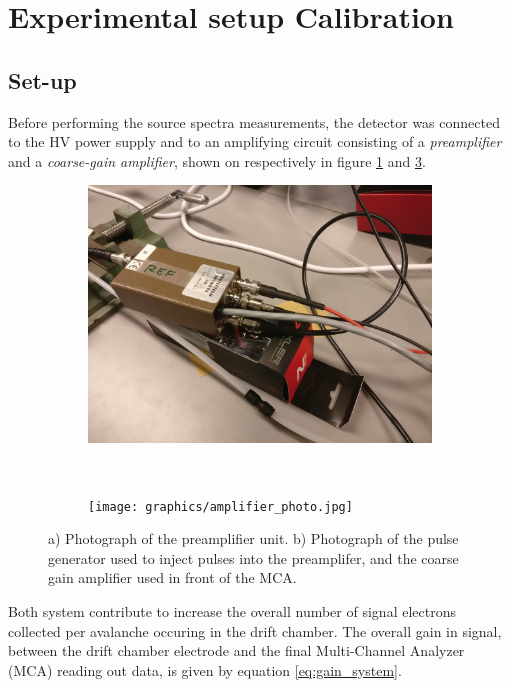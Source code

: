\section{Experimental setup Calibration}

\subsection{Set-up}
\label{sec:calibration:set-up}
Before performing the source spectra measurements, the detector was connected to the HV power supply and to an amplifying circuit consisting of a \textit{preamplifier} and a \textit{coarse-gain amplifier}, shown on respectively in figure \ref{fig:preamp_photo} and \ref{fig:ampli_gene}. 

\begin{figure}[H]
  \begin{subfigure}[b]{0.45\textwidth}
    \includegraphics[width=\textwidth]{graphics/preamplifier.jpg}
    \caption{}
    \label{fig:preamp_photo}
  \end{subfigure}
  ~
  \begin{subfigure}[b]{0.5\textwidth}
    \texttt{[image: graphics/amplifier\_photo.jpg]}
    \caption{}
    \label{fig:ampli_gene}
  \end{subfigure}
  \caption{a) Photograph of the preamplifier unit. b) Photograph of the pulse generator used to inject pulses into the preamplifer, and the coarse gain amplifier used in front of the MCA.}
\end{figure}

Both system contribute to increase the overall number of signal electrons collected per avalanche occuring in the drift chamber. The overall gain in signal, between the drift chamber electrode and the final Multi-Channel Analyzer (MCA) reading out data, is given by equation \ref{eq:gain_system}.

